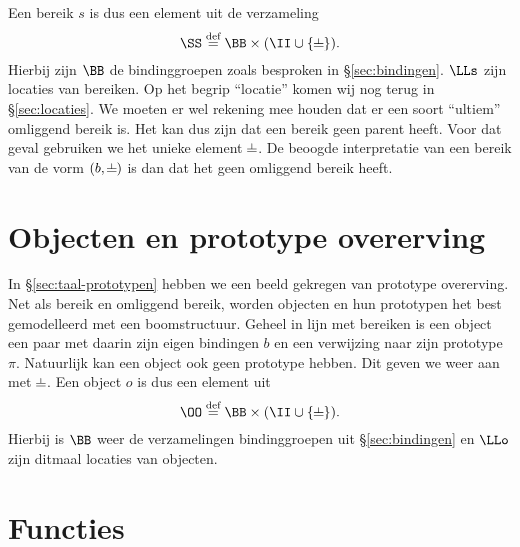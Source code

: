 Een bereik $s$ is dus een element uit de verzameling
%
\begin{equation*}
  \SS \DEF \BB \times (\II \cup \{\nil\}).
\end{equation*}
%
Hierbij zijn $\BB$ de bindinggroepen zoals besproken in §\ref{sec:bindingen}. $\LLs$ zijn locaties van bereiken. Op het begrip “locatie” komen wij nog terug in §\ref{sec:locaties}. We moeten er wel rekening mee houden dat er een soort “ultiem” omliggend bereik is. Het kan dus zijn dat een bereik geen parent heeft. Voor dat geval gebruiken we het unieke element $\nil$. De beoogde interpretatie van een bereik van de vorm $(b, \nil)$ is dan dat het geen omliggend bereik heeft.

\section{Objecten en prototype overerving}
\label{sec:sem-objecten}

In §\ref{sec:taal-prototypen} hebben we een beeld gekregen van prototype overerving. Net als bereik en omliggend bereik, worden objecten en hun prototypen het best gemodelleerd met een boomstructuur. Geheel in lijn met bereiken is een object een paar met daarin zijn eigen bindingen $b$ en een verwijzing naar zijn prototype $\pi$. Natuurlijk kan een object ook geen prototype hebben. Dit geven we weer aan met $\nil$. Een object $o$ is dus een element uit
%
\begin{equation*}
  \OO \DEF \BB \times (\II \cup \{\nil\}).
\end{equation*}
%
Hierbij is $\BB$ weer de verzamelingen bindinggroepen uit §\ref{sec:bindingen} en $\LLo$ zijn ditmaal locaties van objecten.

\section{Functies}
\label{sec:functies}

